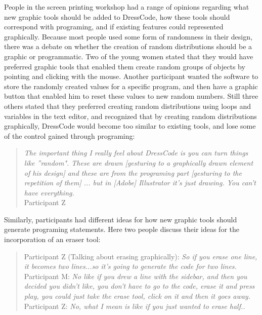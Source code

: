 \documentclass{sigchi}
\begin{document}
People in the screen printing workshop had a range of opinions regarding what new graphic tools should be added to DressCode, how these tools should correspond with programing, and if existing features could represented graphically. Because most people used some form of randomness in their design, there was a debate on whether the creation of random distributions should be a graphic or programmatic. Two of the young women stated that they would have preferred graphic tools that enabled them create random groups of objects by pointing and clicking with the mouse. Another participant wanted the software to store the randomly created values for a specific program, and then have a graphic button that enabled him to reset these values to new random numbers. Still three others stated that they preferred creating random distributions using loops and variables in the text editor, and recognized that by creating random distributions graphically, DressCode would become too similar to existing tools, and lose some of the control gained through programing:
\begin{quote}
\textit{The important thing I really feel about DressCode is you can turn things like ''random". These are drawn [gesturing to a graphically drawn element of his design] and these are from the programing part [gesturing to the repetition of them] ... but in [Adobe] Illustrator it's just drawing. You can't have everything.}
\\Participant Z
\end{quote}

Similarly, participants had different ideas for how new graphic tools should generate programing statements. Here two people discuss their ideas for the incorporation of an eraser tool:
\begin{quote}
Participant Z (Talking about erasing graphically): \textit{So if you erase one line, it becomes two lines...so it's going to generate the code for two lines.}
Participant M: \textit{No like if you drew a line with the sidebar, and then you decided you didn't like, you don't have to go to the code, erase it and press play, you could just take the erase tool, click on it and then it goes away.}
Participant Z: \textit{No, what I mean is like if you just wanted to erase half..}
\end{quote}
\end{document}
